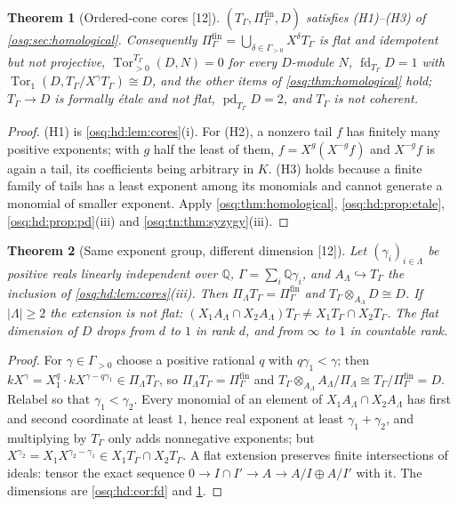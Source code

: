 \documentclass[11pt,letterpaper]{article}
\numberwithin{equation}{section}
\newtheorem{theorem}{Theorem}[section]
\theoremstyle{definition}
\theoremstyle{remark}
\theoremstyle{plain}
\newcommand{\Q}{\mathbb Q}
\newcommand{\Tor}{\operatorname{Tor}}
\newcommand{\pd}{\operatorname{pd}}
\newcommand{\fd}{\operatorname{fd}}
\newcommand{\src}[1]{\textup{\textsf{[#1]}}}
\begin{document}
\begin{theorem}[Ordered-cone cores \src{12}]\label{osq:hd:thm:orderedcone}
$(T_\Gamma,\Pi^{\mathrm{fin}}_\Gamma,D)$ satisfies (H1)--(H3) of \cref{osq:sec:homological}. Consequently
$\Pi^{\mathrm{fin}}_\Gamma=\bigcup_{\delta\in\Gamma_{>0}}X^\delta T_\Gamma$ is flat and idempotent but not projective,
$\Tor^{T_\Gamma}_{>0}(D,N)=0$ for every $D$-module $N$, $\fd_{T_\Gamma}D=1$ with $\Tor_1(D,T_\Gamma/X^\gamma T_\Gamma)\cong D$, and
the other items of \cref{osq:thm:homological} hold; $T_\Gamma\to D$ is formally \'etale and not flat, $\pd_{T_\Gamma}D=2$, and
$T_\Gamma$ is not coherent.
\end{theorem}
\begin{proof}
(H1) is \cref{osq:hd:lem:cores}(i). For (H2), a nonzero tail $f$ has finitely many positive exponents; with $g$ half the least of
them, $f=X^g(X^{-g}f)$ and $X^{-g}f$ is again a tail, its coefficients being arbitrary in $K$. (H3) holds because a finite family of
tails has a least exponent among its monomials and cannot generate a monomial of smaller exponent. Apply
\cref{osq:thm:homological}, \cref{osq:hd:prop:etale}, \cref{osq:hd:prop:pd}(iii) and \cref{osq:tn:thm:syzygy}(iii).
\end{proof}

\begin{theorem}[Same exponent group, different dimension \src{12}]\label{osq:hd:thm:collapse}
Let $(\gamma_i)_{i\in\Lambda}$ be positive reals linearly independent over $\Q$, $\Gamma=\sum_i\Q\gamma_i$, and
$A_\Lambda\hookrightarrow T_\Gamma$ the inclusion of \cref{osq:hd:lem:cores}(iii). Then $\Pi_\Lambda T_\Gamma=\Pi^{\mathrm{fin}}_\Gamma$
and $T_\Gamma\otimes_{A_\Lambda}D\cong D$. If $|\Lambda|\ge2$ the extension is not flat:
$(X_1A_\Lambda\cap X_2A_\Lambda)T_\Gamma\ne X_1T_\Gamma\cap X_2T_\Gamma$. The flat dimension of $D$ drops from $d$ to $1$ in rank $d$,
and from $\infty$ to $1$ in countable rank.
\end{theorem}
\begin{proof}
For $\gamma\in\Gamma_{>0}$ choose a positive rational $q$ with $q\gamma_1<\gamma$; then
$kX^\gamma=X_1^q\cdot kX^{\gamma-q\gamma_1}\in\Pi_\Lambda T_\Gamma$, so $\Pi_\Lambda T_\Gamma=\Pi^{\mathrm{fin}}_\Gamma$ and
$T_\Gamma\otimes_{A_\Lambda}A_\Lambda/\Pi_\Lambda\cong T_\Gamma/\Pi^{\mathrm{fin}}_\Gamma=D$. Relabel so that $\gamma_1<\gamma_2$. Every monomial
of an element of $X_1A_\Lambda\cap X_2A_\Lambda$ has first and second coordinate at least $1$, hence real exponent at least
$\gamma_1+\gamma_2$, and multiplying by $T_\Gamma$ only adds nonnegative exponents; but
$X^{\gamma_2}=X_1X^{\gamma_2-\gamma_1}\in X_1T_\Gamma\cap X_2T_\Gamma$. A flat extension preserves finite intersections of ideals: tensor the
exact sequence $0\to I\cap I'\to A\to A/I\oplus A/I'$ with it. The dimensions are \cref{osq:hd:cor:fd} and
\cref{osq:hd:thm:orderedcone}.
\end{proof}
\end{document}
